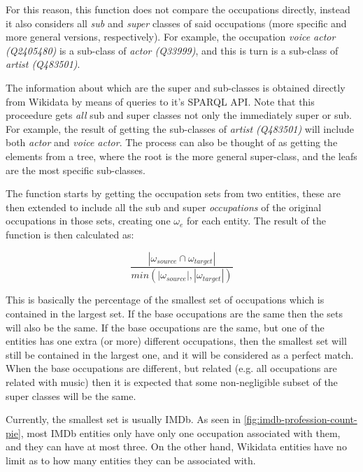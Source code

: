 \documentclass[epsfig,a4paper,11pt,titlepage,twoside,openany]{book}
\begin{document}
For this reason, this function does not compare the occupations directly, instead it also considers all \textit{sub} and \textit{super} classes of said occupations (more specific and more general versions, respectively). For example, the occupation \textit{voice actor (Q2405480)} is a sub-class of \textit{actor (Q33999)}, and this is turn is a sub-class of \textit{artist (Q483501)}. 

The information about which are the super and sub-classes is obtained directly from Wikidata by means of queries to it's SPARQL API. Note that this proceedure gets \textit{all} sub and super classes not only the immediately super or sub. For example, the result of getting the sub-classes of \textit{artist (Q483501)} will include both \textit{actor} and \textit{voice actor}. The process can also be thought of as getting the elements from a tree, where the root is the more general super-class, and the leafs are the most specific sub-classes. 

The function starts by getting the occupation sets from two entities, these are then extended to include all the sub and super \textit{occupations} of the original occupations in those sets, creating one $\omega_e$ for each entity. The result of the function is then calculated as:

\begin{equation*}
    \frac{
        | \omega_{source} \cap \omega_{target} | 
    }{
        min(| \omega_{source} | , | \omega_{target} | )
    }
\end{equation*}

This is basically the percentage of the smallest set of occupations which is contained in the largest set. If the base occupations are the same then the sets will also be the same. If the base occupations are the same, but one of the entities has one extra (or more) different occupations, then the smallest set will still be contained in the largest one, and it will be considered as a perfect match. When the base occupations are different, but related (e.g. all occupations are related with music) then it is expected that some non-negligible subset of the super classes will be the same.

Currently, the smallest set is usually IMDb. As seen in \autoref{fig:imdb-profession-count-pie}, most IMDb entities only have only one occupation associated with them, and they can have at most three. On the other hand, Wikidata entities have no limit as to how many entities they can be associated with. 
\end{document}
